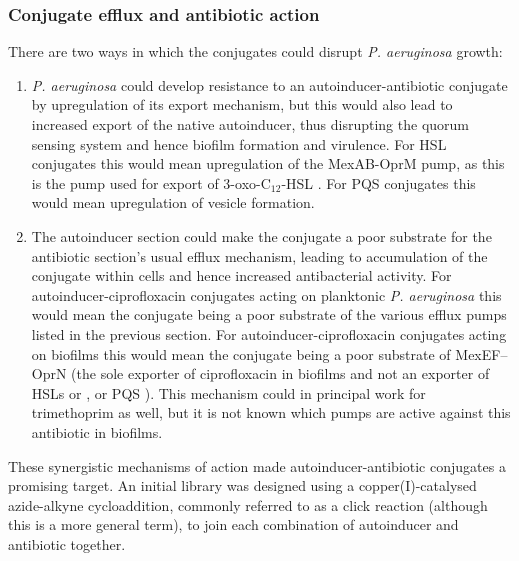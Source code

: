 \subsubsection{Conjugate efflux and antibiotic action\label{sec:conj_eff}}

There are two ways in which the conjugates could disrupt \textit{P. aeruginosa} growth:

\begin{enumerate}

\item \textit{P. aeruginosa} could develop resistance to an autoinducer-antibiotic conjugate by upregulation of its export mechanism, but this would also lead to increased export of the native autoinducer, thus disrupting the quorum sensing system and hence biofilm formation and virulence\cite{Dubern2008,Davies1998,Evans1998}.
For HSL conjugates this would mean upregulation of the MexAB-OprM pump, as this is the pump used for export of 3-oxo-C$_{12}$-HSL \cite{Evans1998,Poole2004}.
For PQS conjugates this would mean upregulation of vesicle formation\cite{Florez2017}.

\item The autoinducer section could make the conjugate a poor substrate for the antibiotic section's usual efflux mechanism, leading to accumulation of the conjugate within cells and hence increased antibacterial activity. 
For autoinducer-ciprofloxacin conjugates acting on planktonic \textit{P. aeruginosa} this would mean the conjugate being a poor substrate of the various efflux pumps listed in the previous section.
For autoinducer-ciprofloxacin conjugates acting on biofilms this would mean the conjugate being a poor substrate of MexEF–OprN (the sole exporter of ciprofloxacin  in biofilms\cite{DeKievit2001} and not an exporter of HSLs  or , or PQS \cite{Poole2004}).
This mechanism could in principal work for trimethoprim  as well, but it is not known which pumps are active against this antibiotic in biofilms. 

\end{enumerate}


These synergistic mechanisms of action made autoinducer-antibiotic conjugates a promising target. An initial library was designed using a copper(I)-catalysed azide-alkyne cycloaddition\cite{Tornoe2002,Rostovtsev2002}, commonly referred to as a click reaction (although this is a more general term), to join each combination of autoinducer and antibiotic together. 



